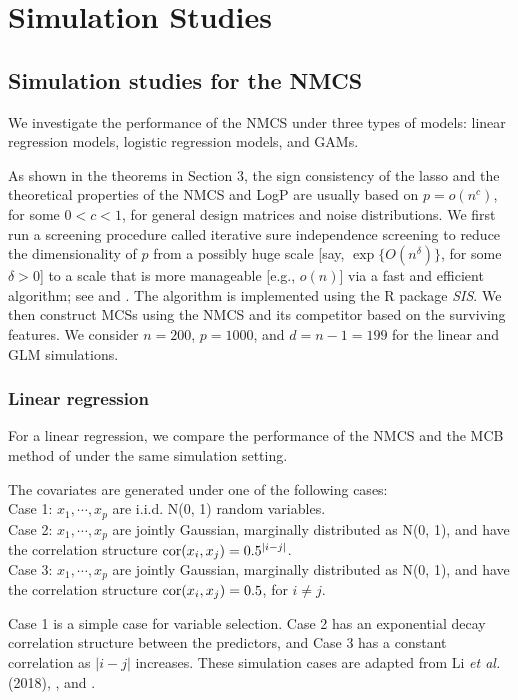 \documentclass[12pt]{article} %
\theoremstyle{definition}
\begin{document}
 \section{Simulation Studies}
 \subsection{Simulation studies for the NMCS}
 \hspace{4mm}
We investigate the performance of the NMCS under three types of models: linear regression models, logistic regression models, and GAMs.

As shown in the theorems in Section 3, the sign consistency of the lasso and the theoretical properties of the NMCS and LogP are usually based on $p=o(n^c)$, for some $0<c<1$, for general design matrices and noise distributions. We first run a screening procedure called iterative sure independence screening to reduce the dimensionality of $p$ from a possibly huge scale [say, $\exp\{O(n^{\delta})\}$, for some $\delta>0$] to a scale that is more manageable [e.g., $o(n)$] via a fast and efficient algorithm; see \citet{fan2008} and \citet{fan2010}. The algorithm is implemented using the R package \textit{SIS}. We then construct MCSs using the NMCS and its competitor based on the surviving features. We consider $n=200$, $p=1000$, and $d=n-1=199$ for the linear and GLM simulations.

\subsubsection{Linear regression}

For a linear regression, we compare the performance of the NMCS and the MCB method of \citet{Li2019} under the same simulation setting.

The covariates are generated under one of the following cases:\\
Case 1: $x_1, \cdots, x_p$ are i.i.d. N(0, 1) random variables.\\
Case 2: $x_1, \cdots, x_p$ are jointly Gaussian, marginally distributed as N(0, 1), and have the correlation
structure ${\rm cor}(x_i, x_j) = 0.5^{|i-j|}$.\\
Case 3: $x_1, \cdots, x_p$ are jointly Gaussian, marginally distributed as N(0, 1), and have the correlation
structure ${\rm cor}(x_i, x_j) = 0.5$, for $i\neq j$.
 
Case 1 is a simple case for variable selection. Case 2 has an exponential decay correlation structure between the predictors, and Case 3 has a constant correlation as $|i-j|$ increases. These simulation cases are adapted from Li {\it et al.} (2018), \citet{fan2008}, and \citet{fan2011}. 
\end{document}
